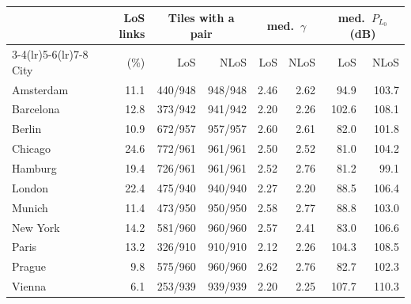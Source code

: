 \begin{tabular}{lrrrrrrr}
\toprule
& LoS links & \multicolumn{2}{c}{Tiles with a pair} & \multicolumn{2}{c}{med.\ $\gamma$} & \multicolumn{2}{c}{med.\ $P_{L_0}$ (dB)} \\
\cmidrule(lr){3-4}\cmidrule(lr){5-6}\cmidrule(lr){7-8}
City & (\%) & LoS & NLoS & LoS & NLoS & LoS & NLoS \\
\midrule
Amsterdam & 11.1 & 440/948 & 948/948 & 2.46 & 2.62 & 94.9 & 103.7 \\
Barcelona & 12.8 & 373/942 & 941/942 & 2.20 & 2.26 & 102.6 & 108.1 \\
Berlin & 10.9 & 672/957 & 957/957 & 2.60 & 2.61 & 82.0 & 101.8 \\
Chicago & 24.6 & 772/961 & 961/961 & 2.50 & 2.52 & 81.0 & 104.2 \\
Hamburg & 19.4 & 726/961 & 961/961 & 2.52 & 2.76 & 81.2 & 99.1 \\
London & 22.4 & 475/940 & 940/940 & 2.27 & 2.20 & 88.5 & 106.4 \\
Munich & 11.4 & 473/950 & 950/950 & 2.58 & 2.77 & 88.8 & 103.0 \\
New York & 14.2 & 581/960 & 960/960 & 2.57 & 2.41 & 83.0 & 106.6 \\
Paris & 13.2 & 326/910 & 910/910 & 2.12 & 2.26 & 104.3 & 108.5 \\
Prague & 9.8 & 575/960 & 960/960 & 2.62 & 2.76 & 82.7 & 102.3 \\
Vienna & 6.1 & 253/939 & 939/939 & 2.20 & 2.25 & 107.7 & 110.3 \\
\bottomrule
\end{tabular}
